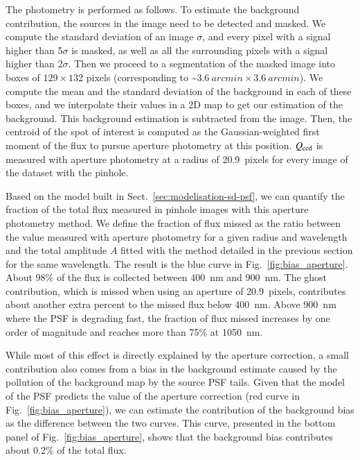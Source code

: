 The photometry is performed as follows. To estimate the background contribution, the sources in the image need to be detected and masked. We compute the standard deviation of an image $\sigma$, and every pixel with a signal higher than 5$\sigma$ is masked, as well as all the surrounding pixels with a signal higher than 2$\sigma$. Then we proceed to a segmentation of the masked image into boxes of $129\times132$ pixels (corresponding to \textasciitilde $\SI{3.6}{arcmin} \times \SI{3.6}{arcmin}$). We compute the mean and the standard deviation of the background in each of these boxes, and we interpolate their values in a 2D map to get our estimation of the background. This background estimation is subtracted from the image. Then, the centroid of the spot of interest is computed as the Gaussian-weighted first moment of the flux to pursue aperture photometry at this position. $Q_{\mathrm{ccd}}$ is measured with aperture photometry at a radius of \SI{20.9}{pixels} for every image of the dataset with the \spinhole pinhole.

Based on the model built in Sect.~\ref{sec:modelisation-sd-psf}, we can quantify the fraction of the total flux measured in \spinhole pinhole images with this aperture photometry method. We define the fraction of flux missed as the ratio between the value measured with aperture photometry for a given radius and wavelength and the total amplitude $A$ fitted with the method detailed in the previous section for the same wavelength. The result is the blue curve in Fig.~\ref{fig:bias_aperture}. About 98\% of the flux is collected between \SI{400}{\nano\meter} and \SI{900}{\nano\meter}. The ghost contribution, which is missed when using an aperture of \SI{20.9}{pixels}, contributes about another extra percent to the missed flux below \SI{400}{\nano\meter}. Above \SI{900}{\nano\meter} where the PSF is degrading fast, the fraction of flux missed increases by one order of magnitude and reaches more than 75\% at \SI{1050}{nm}.

While most of this effect is directly explained by the aperture correction, a small contribution also comes from a bias in the background estimate caused by the pollution of the background map by the source PSF tails. Given that the model of the PSF predicts the value of the aperture correction (red curve in Fig.~\ref{fig:bias_aperture}), we can estimate the contribution of the background bias as the difference between the two curves. This curve, presented in the bottom panel of Fig.~\ref{fig:bias_aperture}, shows that the background bias contributes about 0.2\% of the total flux.

